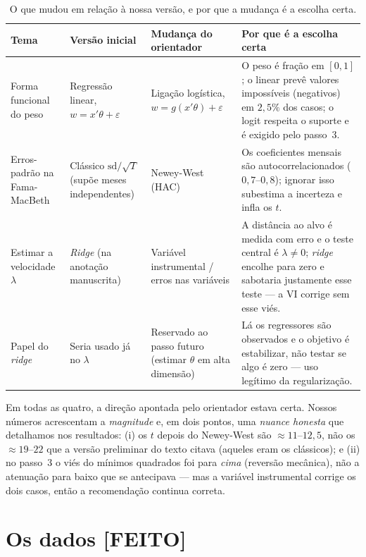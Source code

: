 \documentclass[11pt,a4paper]{article}
\newcommand{\feito}{\textcolor{feitog}{\textbf{[FEITO]}}}
\begin{document}
\begin{table}[h]\centering\footnotesize
\caption{O que mudou em relação à nossa versão, e por que a mudança é a escolha certa.}
\label{tab:logica}
\renewcommand{\arraystretch}{1.25}
\begin{tabular}{@{}p{2.5cm}p{3.0cm}p{3.2cm}p{4.6cm}@{}}
\toprule
Tema & Versão inicial & Mudança do orientador & Por que é a escolha certa \\
\midrule
Forma funcional do peso & Regressão linear, $w=x'\theta+\varepsilon$ & Ligação logística,
$w=g(x'\theta)+\varepsilon$ & O peso é fração em $[0,1]$; o linear prevê valores impossíveis
(negativos) em $2{,}5\%$ dos casos; o logit respeita o suporte e é exigido pelo passo~3. \\
Erros-padrão na Fama-MacBeth & Clássico $\mathrm{sd}/\sqrt{T}$ (supõe meses independentes) &
Newey-West (HAC) & Os coeficientes mensais são autocorrelacionados ($0{,}7$--$0{,}8$); ignorar isso
subestima a incerteza e infla os $t$. \\
Estimar a velocidade $\lambda$ & \emph{Ridge} (na anotação manuscrita) & Variável instrumental /
erros nas variáveis & A distância ao alvo é medida com erro e o teste central é $\lambda\neq0$;
\emph{ridge} encolhe para zero e sabotaria justamente esse teste --- a VI corrige sem esse viés. \\
Papel do \emph{ridge} & Seria usado já no $\lambda$ & Reservado ao passo futuro (estimar $\theta$
em alta dimensão) & Lá os regressores são observados e o objetivo é estabilizar, não testar se algo
é zero --- uso legítimo da regularização. \\
\bottomrule
\end{tabular}
\end{table}

\noindent Em todas as quatro, a direção apontada pelo orientador estava certa. Nossos números
acrescentam a \emph{magnitude} e, em dois pontos, uma \emph{nuance honesta} que detalhamos nos
resultados: (i) os $t$ depois do Newey-West são $\approx11$--$12{,}5$, não os $\approx19$--$22$ que
a versão preliminar do texto citava (aqueles eram os clássicos); e (ii) no passo~3 o viés do
mínimos quadrados foi para \emph{cima} (reversão mecânica), não a atenuação para baixo que se
antecipava --- mas a variável instrumental corrige os dois casos, então a recomendação continua
correta.

\section{Os dados \feito}
\end{document}
